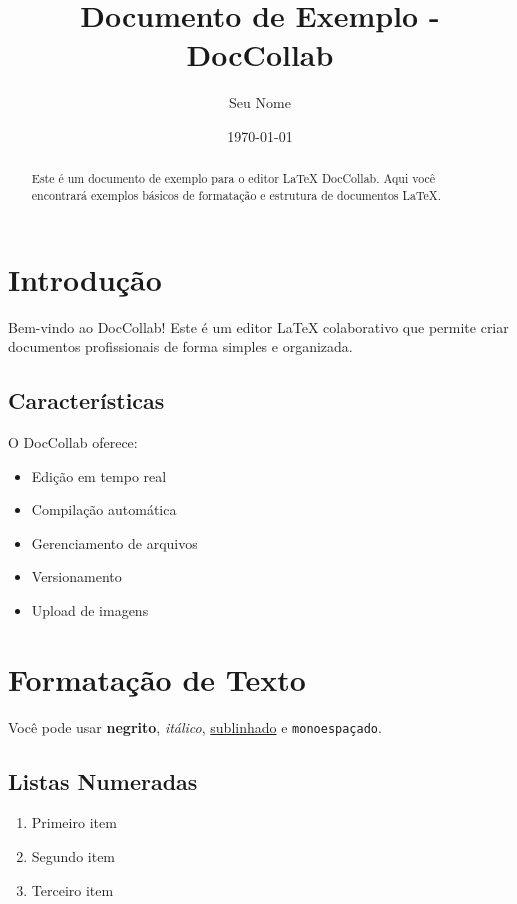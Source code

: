 \documentclass[12pt,a4paper]{article}
\title{Documento de Exemplo - DocCollab}
\author{Seu Nome}
\date{\today}
\begin{document}
\maketitle

\begin{abstract}
Este é um documento de exemplo para o editor LaTeX DocCollab. 
Aqui você encontrará exemplos básicos de formatação e estrutura de documentos LaTeX.
\end{abstract}

\section{Introdução}

Bem-vindo ao DocCollab! Este é um editor LaTeX colaborativo que permite criar documentos profissionais de forma simples e organizada.

\subsection{Características}

O DocCollab oferece:
\begin{itemize}
    \item Edição em tempo real
    \item Compilação automática
    \item Gerenciamento de arquivos
    \item Versionamento
    \item Upload de imagens
\end{itemize}

\section{Formatação de Texto}

Você pode usar \textbf{negrito}, \textit{itálico}, \underline{sublinhado} e \texttt{monoespaçado}.

\subsection{Listas Numeradas}

\begin{enumerate}
    \item Primeiro item
    \item Segundo item
    \item Terceiro item
\end{enumerate}
\end{document}
